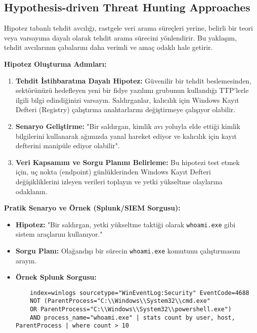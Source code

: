 \subsection{Hypothesis-driven Threat Hunting Approaches}

Hipotez tabanlı tehdit avcılığı, rastgele veri arama süreçleri yerine, belirli bir teori veya varsayıma dayalı olarak tehdit arama sürecini yönlendirir. Bu yaklaşım, tehdit avcılarının çabalarını daha verimli ve amaç odaklı hale getirir.

\textbf{Hipotez Oluşturma Adımları:}

\begin{enumerate}
    \item \textbf{Tehdit İstihbaratına Dayalı Hipotez:} Güvenilir bir tehdit beslemesinden, sektörünüzü hedefleyen yeni bir fidye yazılımı grubunun kullandığı TTP'lerle ilgili bilgi edindiğinizi varsayın. Saldırganlar, kalıcılık için Windows Kayıt Defteri (Registry) çalıştırma anahtarlarını değiştirmeye çalışıyor olabilir.
    \item \textbf{Senaryo Geliştirme:} "Bir saldırgan, kimlik avı yoluyla elde ettiği kimlik bilgilerini kullanarak ağımızda yanal hareket ediyor ve kalıcılık için kayıt defterini manipüle ediyor olabilir".
    \item \textbf{Veri Kapsamını ve Sorgu Planını Belirleme:} Bu hipotezi test etmek için, uç nokta (endpoint) günlüklerinden Windows Kayıt Defteri değişikliklerini izleyen verileri toplayın ve yetki yükseltme olaylarına odaklanın.
\end{enumerate}

\textbf{Pratik Senaryo ve Örnek (Splunk/SIEM Sorgusu):}

\begin{itemize}
    \item \textbf{Hipotez:} "Bir saldırgan, yetki yükseltme taktiği olarak \texttt{whoami.exe} gibi sistem araçlarını kullanıyor."
    \item \textbf{Sorgu Planı:} Olağandışı bir sürecin \texttt{whoami.exe} komutunu çalıştırmasını arayın.
    \item \textbf{Örnek Splunk Sorgusu:}
    \begin{verbatim}
    index=winlogs sourcetype="WinEventLog:Security" EventCode=4688 
    NOT (ParentProcess="C:\\Windows\\System32\\cmd.exe" 
    OR ParentProcess="C:\\Windows\\System32\\powershell.exe") 
    AND process_name="whoami.exe" | stats count by user, host, ParentProcess | where count > 10
    \end{verbatim}
\end{itemize}

